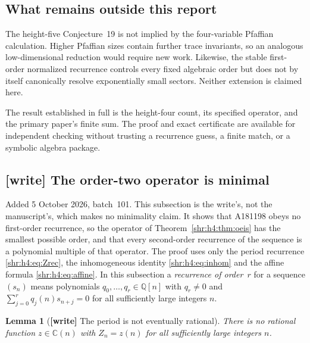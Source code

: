 \documentclass[11pt,letterpaper]{article}
\numberwithin{equation}{section}
\newtheorem{lemma}[theorem]{Lemma}
\theoremstyle{definition}
\newcommand{\Q}{\mathbb Q}
\newcommand{\1}{\mathbf 1}
\begin{document}
\subsection{What remains outside this report}
The height-five Conjecture~19 is not implied by the four-variable
Pfaffian calculation. Higher Pfaffian sizes contain further trace
invariants, so an analogous low-dimensional reduction would require new
work. Likewise, the stable first-order normalized recurrence controls
every fixed algebraic order but does not by itself canonically resolve
exponentially small sectors. Neither extension is claimed here.

The result established in full is the height-four count, its specified
operator, and the primary paper's finite sum. The proof and exact
certificate are available for independent checking without trusting a
recurrence guess, a finite match, or a symbolic algebra package.

\subsection{[write] The order-two operator is minimal}
\label{shr:h4:sec:minimal}

Added 5 October 2026, batch~101. This subsection is the write's, not the
manuscript's, which makes no minimality claim. It shows that A181198 obeys
no first-order recurrence, so the operator of
Theorem~\ref{shr:h4:thm:oeis} has the smallest possible order, and that
every second-order recurrence of the sequence is a polynomial multiple of
that operator. The proof uses only the period recurrence
\eqref{shr:h4:eq:Zrec}, the inhomogeneous identity \eqref{shr:h4:eq:inhom}
and the affine formula \eqref{shr:h4:eq:affine}. In this subsection a
\emph{recurrence of order~$r$} for a sequence $(s_n)$ means polynomials
$q_0,\ldots,q_r\in\Q[n]$ with $q_r\ne0$ and
$\sum_{j=0}^rq_j(n)s_{n+j}=0$ for all sufficiently large integers $n$.

\begin{lemma}[\textbf{[write]} The period is not eventually rational]
\label{shr:h4:lem:Zirr}
There is no rational function $z\in\mathbb C(n)$ with $Z_n=z(n)$ for all
sufficiently large integers $n$.
\end{lemma}
\end{document}

